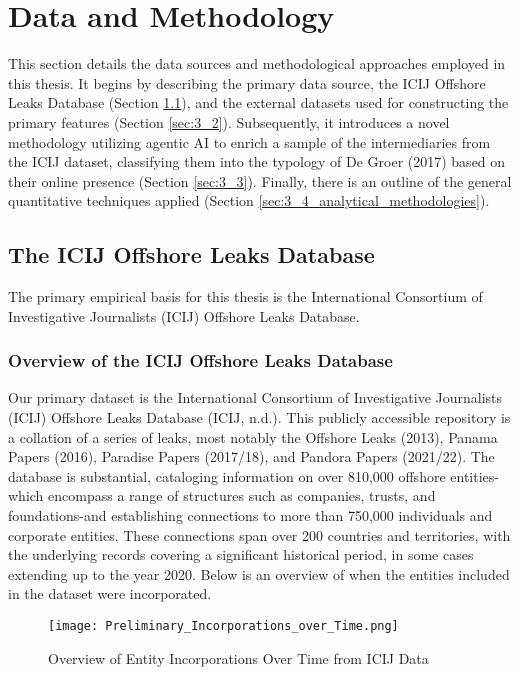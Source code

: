 \chapter{Data and Methodology}
\label{chap:data_methodology}

This section details the data sources and methodological approaches employed in this thesis. It begins by describing the primary data source, the ICIJ Offshore Leaks Database (Section \ref{sec:3_1}), and the external datasets used for constructing the primary features (Section \ref{sec:3_2}). Subsequently, it introduces a novel methodology utilizing agentic AI to enrich a sample of the intermediaries from the ICIJ dataset, classifying them into the typology of De Groer (2017) based on their online presence (Section \ref{sec:3_3}). Finally, there is an outline of the general quantitative techniques applied (Section \ref{sec:3_4_analytical_methodologies}).

\section{The ICIJ Offshore Leaks Database}
\label{sec:3_1}

The primary empirical basis for this thesis is the International Consortium of Investigative Journalists (ICIJ) Offshore Leaks Database. 

\subsection{Overview of the ICIJ Offshore Leaks Database}

Our primary dataset is the International Consortium of Investigative Journalists (ICIJ) Offshore Leaks Database (ICIJ, n.d.). This publicly accessible repository is a collation of a series of leaks, most notably the Offshore Leaks (2013), Panama Papers (2016), Paradise Papers (2017/18), and Pandora Papers (2021/22). The database is substantial, cataloging information on over 810,000 offshore entities-which encompass a range of structures such as companies, trusts, and foundations-and establishing connections to more than 750,000 individuals and corporate entities. These connections span over 200 countries and territories, with the underlying records covering a significant historical period, in some cases extending up to the year 2020. Below is an overview of when the entities included in the dataset were incorporated.

\begin{figure}[htbp]
    \centering
    \texttt{[image: Preliminary\_Incorporations\_over\_Time.png]}
    \caption{Overview of Entity Incorporations Over Time from ICIJ Data}
    \label{fig:incorporations_time}
\end{figure}

